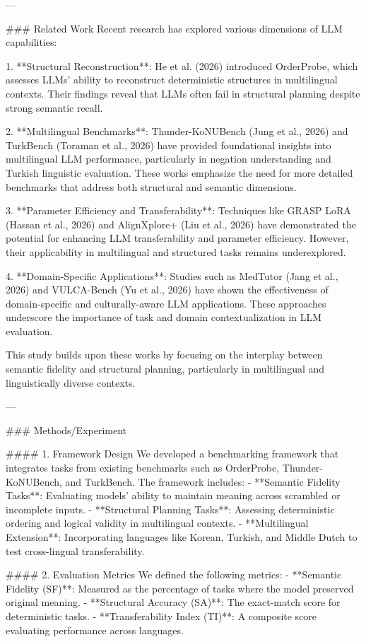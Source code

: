 ---

### Related Work
Recent research has explored various dimensions of LLM capabilities:

1. **Structural Reconstruction**: He et al. (2026) introduced OrderProbe, which assesses LLMs' ability to reconstruct deterministic structures in multilingual contexts. Their findings reveal that LLMs often fail in structural planning despite strong semantic recall.
   
2. **Multilingual Benchmarks**: Thunder-KoNUBench (Jung et al., 2026) and TurkBench (Toraman et al., 2026) have provided foundational insights into multilingual LLM performance, particularly in negation understanding and Turkish linguistic evaluation. These works emphasize the need for more detailed benchmarks that address both structural and semantic dimensions.
   
3. **Parameter Efficiency and Transferability**: Techniques like GRASP LoRA (Hassan et al., 2026) and AlignXplore+ (Liu et al., 2026) have demonstrated the potential for enhancing LLM transferability and parameter efficiency. However, their applicability in multilingual and structured tasks remains underexplored.

4. **Domain-Specific Applications**: Studies such as MedTutor (Jang et al., 2026) and VULCA-Bench (Yu et al., 2026) have shown the effectiveness of domain-specific and culturally-aware LLM applications. These approaches underscore the importance of task and domain contextualization in LLM evaluation.

This study builds upon these works by focusing on the interplay between semantic fidelity and structural planning, particularly in multilingual and linguistically diverse contexts.

---

### Methods/Experiment

#### 1. Framework Design
We developed a benchmarking framework that integrates tasks from existing benchmarks such as OrderProbe, Thunder-KoNUBench, and TurkBench. The framework includes:
- **Semantic Fidelity Tasks**: Evaluating models' ability to maintain meaning across scrambled or incomplete inputs.
- **Structural Planning Tasks**: Assessing deterministic ordering and logical validity in multilingual contexts.
- **Multilingual Extension**: Incorporating languages like Korean, Turkish, and Middle Dutch to test cross-lingual transferability.

#### 2. Evaluation Metrics
We defined the following metrics:
- **Semantic Fidelity (SF)**: Measured as the percentage of tasks where the model preserved original meaning.
- **Structural Accuracy (SA)**: The exact-match score for deterministic tasks.
- **Transferability Index (TI)**: A composite score evaluating performance across languages.

